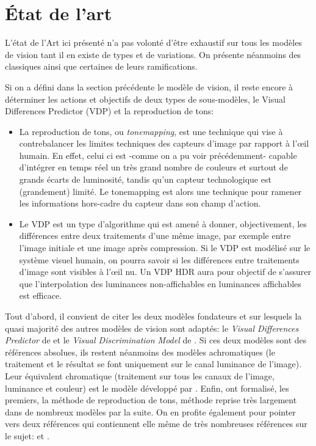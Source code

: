 	\chapter{État de l'art}
	\par L'état de l'Art ici présenté n'a pas volonté d'être exhaustif sur tous les modèles de vision tant il en existe de types et de variations. On présente néanmoins des classiques ainsi que certaines de leurs ramifications.
	
	\par Si on a défini dans la section précédente le modèle de vision, il reste encore à déterminer les actions et objectifs de deux types de sous-modèles, le Visual Differences Predictor (VDP) et la reproduction de tons:
	\begin{itemize}
		\item La reproduction de tons, ou \textit{tonemapping}, est une technique qui vise à contrebalancer les limites techniques des capteurs d'image par rapport à l'œil humain. En effet, celui ci est -comme on a pu voir précédemment- capable d'intégrer en temps réel un très grand nombre de couleurs et surtout de grands écarts de luminosité, tandis qu'un capteur technologique est (grandement) limité. Le tonemapping est alors une technique pour ramener les informations hors-cadre du capteur dans son champ d'action.
		\item Le VDP est un type d'algorithme qui est amené à donner, objectivement, les différences entre deux traitements d'une même image, par exemple entre l'image initiale et une image après compression. Si le VDP est modélisé sur le système visuel humain, on pourra savoir si les différences entre traitements d'image sont visibles à l'œil nu. Un VDP HDR aura pour objectif de s'assurer que l'interpolation des luminances non-affichables en luminances affichables est efficace.
	\end{itemize}
	
	\par Tout d'abord, il convient de citer les deux modèles fondateurs et sur lesquels la quasi majorité des autres modèles de vision sont adaptés: le \textit{Visual Differences Predictor} de \citep{daly_visible_1992} et le \textit{Visual Discrimination Model} de \citep{lubin_visual_1995}. Si ces deux modèles sont des références absolues, ils restent néanmoins des modèles achromatiques (le traitement et le résultat se font uniquement sur le canal luminance de l'image). Leur équivalent chromatique (traitement sur tous les canaux de l'image, luminance et couleur) est le modèle développé par \citep{pattanaik_multiscale_1998}. Enfin, \citep{rushmeier_comparing_1995} ont formalisé, les premiers, la méthode de reproduction de tons, méthode reprise très largement dans de nombreux modèles par la suite. On en profite également pour pointer vers deux références qui contiennent elle même de très nombreuses références sur le sujet: \citep{moreau_traite_2006} et \citep{bradley_wavelet_1999}.
	
